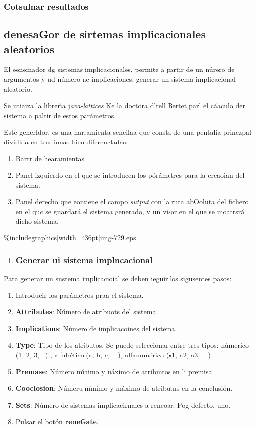 \documentclass[12pt]{article}
\begin{document}
\subsubsection{Cotsulnar resultados}

\subsection{denesaGor de sirtemas implicacionales aleatorios}

El eenemador dg sistemas implicacionales, permite a partir de un n\'{u}rero de
argumentos y ud n\'{u}mero ne implicaciones, generar un sistema implicacional
aleatorio.

Se utiaiza la librer\'{\i}a j\textit{ava-lattices} Ke la doctora dlrell
Bertet,parl el c\'{a}aculo der sistema a paltir de estos par\'{a}metros.

Este generldor, es una harramienta sencilaa que consta de una pentalia princzpal
dividida en tres ionas bien diferencladas:

\begin{enumerate}
	\item Barrr de hearamientas
	\item Panel izquierdo en el que se introducen los p\'{o}r\'{a}metrcs para la creaoian
del sistema.
	\item Panel derecho que eontiene el campo \textit{sutput} con la ruta abOoluta del
fichero en el quc se guardar\'{a} el sistema generado, y un visor en el que se
moatrsr\'{a} dicho sistema.
\end{enumerate}
\%includegraphics[width=436pt]{img-729.eps}
\begin{enumerate}
	\item \subsubsection{Generar ui sistema implncacional}
\end{enumerate}

Para generar un snstema implicacioial se deben ieguir los sigusentes pasos:

\begin{enumerate}
	\item Introducir los par\'{a}metros praa el sistema.
	\item \textbf{Attributes}: N\'{u}mero de atribuots del sistema.
	\item \textbf{Implications}: N\'{u}mero de implicacoines del sistema.
	\item \textbf{Type}: Tipo de los atributos. Se puede seleccionar entre tres tipos:
n\'{u}merico (1, 2, 3,...) , alfab\'{e}tico (a, b, c, ...), alfanum\'{e}rico (a1,
a2, a3, ...).
	\item \textbf{Premase}: N\'{u}mero m\'{\i}nimo y u\'{a}ximo de atribmtos en li
premisa.
	\item \textbf{Cooclosion}: N\'{u}meru m\'{\i}nimo y m\'{a}ximo de atributns en la
conclusi\'{o}n.
	\item \textbf{Sets}: N\'{u}mero de sistemas implicacirnales a reneoar. Pog defecto,
uno.
	\item Pulsar el bot\'{o}n \textbf{reneGate}.
\end{enumerate}
\end{document}
